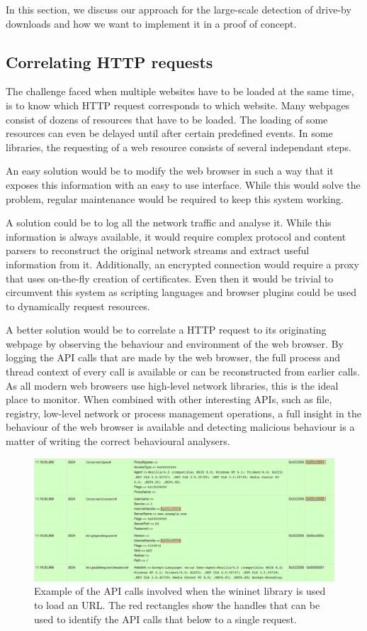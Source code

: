 In this section, we discuss our approach for the large-scale detection of drive-by downloads and how we want to implement it in a proof of concept.

\subsection{Correlating HTTP requests}

The challenge faced when multiple websites have to be loaded at the same time, is to know which HTTP request corresponds to which website. Many webpages consist of dozens of resources that have to be loaded. The loading of some resources can even be delayed until after certain predefined events. In some libraries, the requesting of a web resource consists of several independant steps.

An easy solution would be to modify the web browser in such a way that it exposes this information with an easy to use interface. While this would solve the problem, regular maintenance would be required to keep this system working. 

A solution could be to log all the network traffic and analyse it. While this information is always available, it would require complex protocol and content parsers to reconstruct the original network streams and extract useful information from it. Additionally, an encrypted connection would require a proxy that uses on-the-fly creation of certificates. Even then it would be trivial to circumvent this system as scripting languages and browser plugins could be used to dynamically request resources.

A better solution would be to correlate a HTTP request to its originating webpage by observing the behaviour and environment of the web browser. By logging the API calls that are made by the web browser, the full process and thread context of every call is available or can be reconstructed from earlier calls. As all modern web browsers use high-level network libraries, this is the ideal place to monitor. When combined with other interesting APIs, such as file, registry, low-level network or process management operations, a full insight in the behaviour of the web browser is available and detecting malicious behaviour is a matter of writing the correct behavioural analysers.

\begin{figure}
    \centering
    \includegraphics[width=14.7cm]{Images/wininet.png}
    \caption{Example of the API calls involved when the wininet library is used to load an URL. The red rectangles show the handles that can be used to identify the API calls that below to a single request.}
    \label{fig:wininet}
\end{figure}

